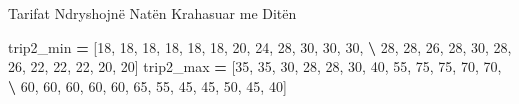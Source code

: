 \documentclass[
  ignorenonframetext,
]{beamer}
\newenvironment{Shaded}{\begin{snugshade}}{\end{snugshade}}
\newcommand{\DecValTok}[1]{\textcolor[rgb]{0.00,0.00,0.81}{#1}}
\newcommand{\NormalTok}[1]{#1}
\newcommand{\OperatorTok}[1]{\textcolor[rgb]{0.81,0.36,0.00}{\textbf{#1}}}
\begin{document}
\begin{frame}[fragile]{Tarifat Ndryshojnë Natën Krahasuar me Ditën}
\begin{Shaded}
\begin{Highlighting}[]
\NormalTok{trip2\_min }\OperatorTok{=}\NormalTok{ [}\DecValTok{18}\NormalTok{, }\DecValTok{18}\NormalTok{, }\DecValTok{18}\NormalTok{, }\DecValTok{18}\NormalTok{, }\DecValTok{18}\NormalTok{, }\DecValTok{18}\NormalTok{, }\DecValTok{20}\NormalTok{, }\DecValTok{24}\NormalTok{, }\DecValTok{28}\NormalTok{, }\DecValTok{30}\NormalTok{, }\DecValTok{30}\NormalTok{, }\DecValTok{30}\NormalTok{, }\OperatorTok{\textbackslash{}}
             \DecValTok{28}\NormalTok{, }\DecValTok{28}\NormalTok{, }\DecValTok{26}\NormalTok{, }\DecValTok{28}\NormalTok{, }\DecValTok{30}\NormalTok{, }\DecValTok{28}\NormalTok{, }\DecValTok{26}\NormalTok{, }\DecValTok{22}\NormalTok{, }\DecValTok{22}\NormalTok{, }\DecValTok{22}\NormalTok{, }\DecValTok{20}\NormalTok{, }\DecValTok{20}\NormalTok{]}
\NormalTok{trip2\_max }\OperatorTok{=}\NormalTok{ [}\DecValTok{35}\NormalTok{, }\DecValTok{35}\NormalTok{, }\DecValTok{30}\NormalTok{, }\DecValTok{28}\NormalTok{, }\DecValTok{28}\NormalTok{, }\DecValTok{30}\NormalTok{, }\DecValTok{40}\NormalTok{, }\DecValTok{55}\NormalTok{, }\DecValTok{75}\NormalTok{, }\DecValTok{75}\NormalTok{, }\DecValTok{70}\NormalTok{, }\DecValTok{70}\NormalTok{, }\OperatorTok{\textbackslash{}}
             \DecValTok{60}\NormalTok{, }\DecValTok{60}\NormalTok{, }\DecValTok{60}\NormalTok{, }\DecValTok{60}\NormalTok{, }\DecValTok{60}\NormalTok{, }\DecValTok{65}\NormalTok{, }\DecValTok{55}\NormalTok{, }\DecValTok{45}\NormalTok{, }\DecValTok{45}\NormalTok{, }\DecValTok{50}\NormalTok{, }\DecValTok{45}\NormalTok{, }\DecValTok{40}\NormalTok{]}
\end{Highlighting}
\end{Shaded}
\end{frame}
\end{document}
